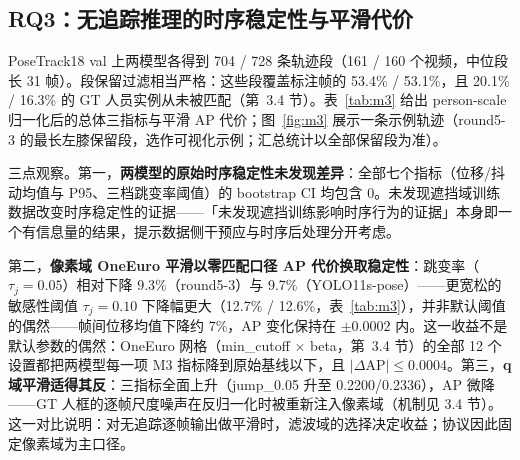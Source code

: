 \documentclass[10pt,conference]{IEEEtran}
\begin{document}
\subsection{RQ3：无追踪推理的时序稳定性与平滑代价}

PoseTrack18 val 上两模型各得到 704 / 728 条轨迹段（161 / 160 个视频，中位段长 31 帧）。段保留过滤相当严格：这些段覆盖标注帧的 53.4\% / 53.1\%，且 20.1\% / 16.3\% 的 GT 人员实例从未被匹配（第~3.4 节）。表~\ref{tab:m3} 给出 person-scale 归一化后的总体三指标与平滑 AP 代价；图~\ref{fig:m3} 展示一条示例轨迹（round5-3 的最长左膝保留段，选作可视化示例；汇总统计以全部保留段为准）。

\begin{table}[t]
\centering
\caption{M3 时序指标（总体，17 关键点平均）与平滑 AP 代价。匹配口径 AP 为在抖动指标所用同一批匹配轨迹帧上重算的 AP（原始值：round5-3 0.1316 / YOLO11s-pose 0.1408）；--- $=$ 原始参照，未施加平滑。粗体 AP 代价 $=$ 位于零的 $\pm0.0002$ 内（零精度代价）。逐指标的域间差与模型间差 CI 见附录~A（表~A5）。}
\label{tab:m3}
\renewcommand{\arraystretch}{1.15}
\end{table}

三点观察。第一，\textbf{两模型的原始时序稳定性未发现差异}：全部七个指标（位移/抖动均值与 P95、三档跳变率阈值）的 bootstrap CI 均包含 0。未发现遮挡域训练数据改变时序稳定性的证据——「未发现遮挡训练影响时序行为的证据」本身即一个有信息量的结果，提示数据侧干预应与时序后处理分开考虑。

第二，\textbf{像素域 OneEuro 平滑以零匹配口径 AP 代价换取稳定性}：跳变率（$\tau_j=0.05$）相对下降 9.3\%（round5-3）与 9.7\%（YOLO11s-pose）——更宽松的敏感性阈值 $\tau_j=0.10$ 下降幅更大（12.7\% / 12.6\%，表~\ref{tab:m3}），并非默认阈值的偶然——帧间位移均值下降约 7\%，AP 变化保持在 $\pm0.0002$ 内。这一收益不是默认参数的偶然：OneEuro 网格（min\_cutoff $\times$ beta，第~3.4 节）的全部 12 个设置都把两模型每一项 M3 指标降到原始基线以下，且 $|\Delta\mathrm{AP}|\le 0.0004$。第三，\textbf{q 域平滑适得其反}：三指标全面上升（jump\_0.05 升至 0.2200/0.2336），AP 微降——GT 人框的逐帧尺度噪声在反归一化时被重新注入像素域（机制见 3.4 节）。这一对比说明：对无追踪逐帧输出做平滑时，滤波域的选择决定收益；协议因此固定像素域为主口径。
\end{document}
